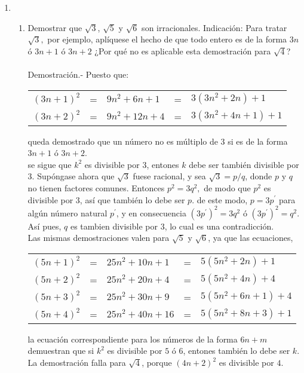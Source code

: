 \begin{enumerate}
\item 
\begin{enumerate}[\bfseries a)]
\item Demostrar que $\sqrt{3}$, $\sqrt{5}$ y $\sqrt{6}$ son irracionales. Indicación: Para tratar $\sqrt{3},$ por ejemplo, aplíquese el hecho de que todo entero es de la forma $3n$ ó $3n+1$ ó $3n+2$ ¿Por qué no es aplicable esta demostración para $\sqrt{4}$?\\\\
Demostración.- \; Puesto que:
\begin{center}
\begin{tabular}{r c l c l}
$(3n+1)^2$&=&$9n^2 + 6n + 1$&=&$3(3n^2+2n) + 1$\\
$(3n+2)^2$&=&$9n^2+12n + 4$&=&$3(3n^2 + 4n + 1) + 1$\\
\end{tabular}
\end{center}
queda demostrado que un número no es múltiplo de $3$ si es de la forma $3n+1$ ó $3n+2$.\\
se sigue que $k^2$ es divisible por $3$, entones $k$ debe ser también divisible por $3$. Supóngase ahora que $\sqrt{3}$ fuese racional, y sea $\sqrt{3} = p/q$, donde $p$ \; y \; $q$ no tienen factores comunes. Entonces $p^2=3q^2,$ de modo que $p^2$ es divisible por $3$, así que también lo debe ser $p$. de este modo, $p=3p^{'}$ para algún número natural $p^{'}$, y en consecuencia $(3p^{'})^2 = 3q^2$ ó $(3p^{'})^2 = q^2.$ Así pues, $q$ es tambien divisible por $3$, lo cual es una contradicción.\\
Las mismas demostraciones valen para $\sqrt{5}$ y $\sqrt{6}$, ya que las ecuaciones,
\begin{center}
\begin{tabular}{rclcl}
$(5n+1)^2$&=&$25n^2 + 10n + 1$&=&$5(5n^2 + 2n)+1$\\
$(5n+2)^2$&=&$25n^2 + 20n + 4$&=&$5(5n^2 + 4n)+4$\\
$(5n+3)^2$&=&$25n^2 + 30n + 9$&=&$5(5n^2 + 6n + 1)+4$\\
$(5n+4)^2$&=&$25n^2 + 40n + 16$&=&$5(5n^2+8n+3)+1$\\
\end{tabular}
\end{center}
la ecuación correspondiente para los números de la forma $6n+m$ demuestran que si $k^2$ es divisible por $5$ ó $6$, entones también lo debe ser $k$. La demostración falla para $\sqrt{4}$, porque $(4n+2)^2$ es divisible por $4$.\\\\


\end{enumerate}
\end{enumerate}
